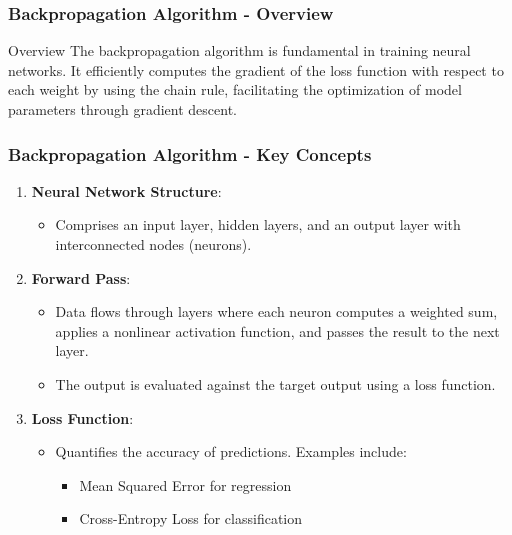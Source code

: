 \documentclass[aspectratio=169]{beamer}
\begin{document}
\begin{frame}[fragile]
    \frametitle{Backpropagation Algorithm - Overview}
    \begin{block}{Overview}
        The backpropagation algorithm is fundamental in training neural networks. It efficiently computes the gradient of the loss function with respect to each weight by using the chain rule, facilitating the optimization of model parameters through gradient descent.
    \end{block}
\end{frame}

\begin{frame}[fragile]
    \frametitle{Backpropagation Algorithm - Key Concepts}
    \begin{enumerate}
        \item \textbf{Neural Network Structure}:
        \begin{itemize}
            \item Comprises an input layer, hidden layers, and an output layer with interconnected nodes (neurons).
        \end{itemize}
        
        \item \textbf{Forward Pass}:
        \begin{itemize}
            \item Data flows through layers where each neuron computes a weighted sum, applies a nonlinear activation function, and passes the result to the next layer.
            \item The output is evaluated against the target output using a loss function.
        \end{itemize}

        \item \textbf{Loss Function}:
        \begin{itemize}
            \item Quantifies the accuracy of predictions. Examples include:
            \begin{itemize}
                \item Mean Squared Error for regression
                \item Cross-Entropy Loss for classification
            \end{itemize}
        \end{itemize}
    \end{enumerate}
\end{frame}
\end{document}
